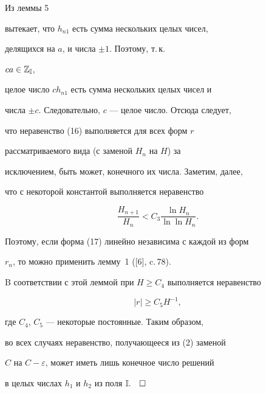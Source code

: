 Из леммы 5 


вытекает, что $h_{n1}$ есть сумма нескольких целых чисел, 


делящихся на $a$, и числа $\pm1$. Поэтому, т.\,к. 


$ca\in\Bbb Z_{\Bbb I}$, 


целое число $ch_{n1}$ есть сумма нескольких целых чисел и 


числа $\pm c$. Следовательно, $c$ --- целое число. Отсюда следует, 


что неравенство (16) выполняется для всех форм $r$ 


рассматриваемого вида (с заменой $H_n$ на $H$) за 


исключением, быть может, конечного их числа. Заметим, далее, 


что с некоторой константой выполняется неравенство 


$$ 


\frac{H_{n+1}}{H_n}<C_3\frac{\ln H_n}{\ln\ln H_n}. 


$$ 


Поэтому, если форма (17) линейно независима с каждой из форм 


$r_n$, то можно применить лемму~1 ([6], c.\,78). 


B соответствии с этой леммой при $H\ge C_4$ выполняется неравенство 


$$ 


|r|\ge C_5H^{-1}, 


$$ 


где $C_4$, $C_5$ --- некоторые постоянные. Таким образом,


во всех случаях неравенство, получающееся из (2) заменой 


$C$ на $C-\varepsilon$, может иметь лишь конечное число решений 


в целых числах $h_1$ и $h_2$ из поля $\Bbb I.\quad\square$ 


 


 


